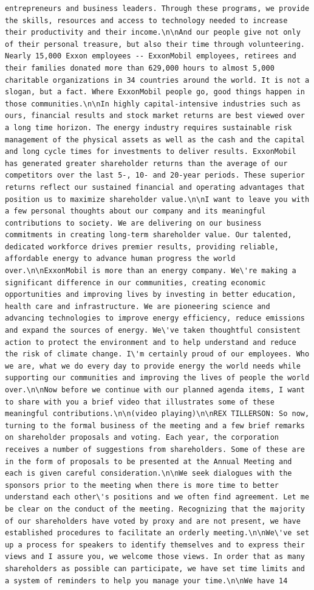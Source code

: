 \documentclass[
  letterpaper,
  DIV=11,
  numbers=noendperiod]{scrreprt}
\begin{document}
\begin{verbatim}
entrepreneurs and business leaders. Through these programs, we provide the skills, resources and access to technology needed to increase their productivity and their income.\n\nAnd our people give not only of their personal treasure, but also their time through volunteering. Nearly 15,000 Exxon employees -- ExxonMobil employees, retirees and their families donated more than 629,000 hours to almost 5,000 charitable organizations in 34 countries around the world. It is not a slogan, but a fact. Where ExxonMobil people go, good things happen in those communities.\n\nIn highly capital-intensive industries such as ours, financial results and stock market returns are best viewed over a long time horizon. The energy industry requires sustainable risk management of the physical assets as well as the cash and the capital and long cycle times for investments to deliver results. ExxonMobil has generated greater shareholder returns than the average of our competitors over the last 5-, 10- and 20-year periods. These superior returns reflect our sustained financial and operating advantages that position us to maximize shareholder value.\n\nI want to leave you with a few personal thoughts about our company and its meaningful contributions to society. We are delivering on our business commitments in creating long-term shareholder value. Our talented, dedicated workforce drives premier results, providing reliable, affordable energy to advance human progress the world over.\n\nExxonMobil is more than an energy company. We\'re making a significant difference in our communities, creating economic opportunities and improving lives by investing in better education, health care and infrastructure. We are pioneering science and advancing technologies to improve energy efficiency, reduce emissions and expand the sources of energy. We\'ve taken thoughtful consistent action to protect the environment and to help understand and reduce the risk of climate change. I\'m certainly proud of our employees. Who we are, what we do every day to provide energy the world needs while supporting our communities and improving the lives of people the world over.\n\nNow before we continue with our planned agenda items, I want to share with you a brief video that illustrates some of these meaningful contributions.\n\n(video playing)\n\nREX TILLERSON: So now, turning to the formal business of the meeting and a few brief remarks on shareholder proposals and voting. Each year, the corporation receives a number of suggestions from shareholders. Some of these are in the form of proposals to be presented at the Annual Meeting and each is given careful consideration.\n\nWe seek dialogues with the sponsors prior to the meeting when there is more time to better understand each other\'s positions and we often find agreement. Let me be clear on the conduct of the meeting. Recognizing that the majority of our shareholders have voted by proxy and are not present, we have established procedures to facilitate an orderly meeting.\n\nWe\'ve set up a process for speakers to identify themselves and to express their views and I assure you, we welcome those views. In order that as many shareholders as possible can participate, we have set time limits and a system of reminders to help you manage your time.\n\nWe have 14 
\end{verbatim}
\end{document}
